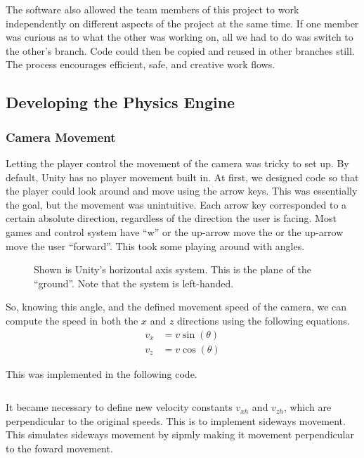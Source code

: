 \documentclass[12pt]{article}
\begin{document}
The software also allowed the team members of this project to work independently on different aspects of the project at the same time. If one member was curious as to what the other was working on, all we had to do was switch to the other's branch. Code could then be copied and reused in other branches still. The process encourages efficient, safe, and creative work flows.  


\subsection{Developing the Physics Engine}

\subsubsection{Camera Movement}

Letting the player control the movement of the camera was tricky to set up. By default, Unity has no player movement built in. At first, we designed code so that the player could look around and move using the arrow keys. This was essentially the goal, but the movement was unintuitive. Each arrow key corresponded to a certain absolute direction, regardless of the direction the user is facing. Most games and control system have \enquote{w} or the up-arrow move the or the up-arrow move the user \enquote{forward}. This took some playing around with angles.

\begin{figure}[h]
  \centering
  \caption{Shown is Unity's horizontal axis system. This is the plane of the \enquote{ground}. Note that the system is left-handed.}
\end{figure}

So, knowing this angle, and the defined movement speed of the camera, we can compute the speed in both the $x$ and $z$ directions using the following equations.
\begin{align}
v_x &= v \sin(\theta) \\
v_z &= v \cos(\theta)
\end{align}

This was implemented in the following code.
\inputminted[firstline=12,lastline=29,linenos,fontsize=\footnotesize,bgcolor=codebg]{csharp}{../unity/Assets/Scripts/Engine/FreeCamera.cs}

It became necessary to define new velocity constants $v_\mathit{xh}$ and $v_\mathit{zh}$, which are perpendicular to the original speeds. This is to implement sideways movement. This simulates sideways movement by sipmly making it movement perpendicular to the foward movement.
\end{document}
